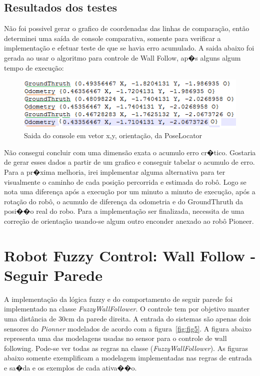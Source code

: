 \documentclass[twoside,conference,a4paper]{IEEEtran}
\begin{document}
\subsection{Resultados dos testes}

Não foi possivel gerar o grafico de coordenadas das linhas de comparação, então determinei uma saída de console comparativa, somente para verificar a implementação e efetuar teste de que se havia erro acumulado.
A saida abaixo foi gerada ao usar o algoritmo para controle de Wall Follow, ap�s alguns algum tempo de execução:

\begin{figure}[ht]
\centering
\includegraphics[width=1\hsize]{images/console-1.png}
\caption{Saida do console em vetor x,y, orientação, da PoseLocator}
\label{fig:fig3}
\end{figure}

Não consegui concluir com uma dimensão exata o acumulo erro cr�tico. Gostaria de gerar esses dados a partir de um grafico e conseguir tabelar o acumulo de erro. Para a pr�xima melhoria, irei implementar alguma alternativa para ter visualmente o caminho de cada posição percorrida e estimada do robô.
Logo se nota uma diferença após a execução por um minuto a minuto de execução, após a rotação do robô, o acumulo de diferença da odometria e do GroundThruth da posi��o real do robo. Para a implementação ser finalizada, necessita de uma correção de orientação usando-se algum outro enconder anexado ao robô Pioneer.


\section{Robot Fuzzy Control: Wall Follow - Seguir Parede}
A implementação da lógica fuzzy e do comportamento de seguir parede foi implementado na classe \textit{FuzzyWallFollower}. O controle tem por objetivo manter uma distância de 30cm da parede direita. A entrada do sistemas são apenas dois sensores do \textit{Pionner} modelados de acordo com a figura~\ref{fig:fig5}. A figura abaixo representa uma das modelagens usadas no sensor para o controle de wall following.
Pode-se ver todas as regras na classe (\textit{FuzzyWallFollower}). As figuras abaixo somente exemplificam a modelagem implementadas nas regras de entrada e sa�da e os exemplos de cada ativa��o.
\end{document}
